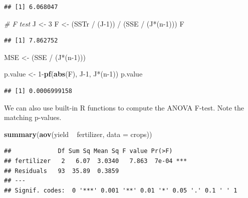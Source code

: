 \documentclass[]{book}
\newenvironment{Shaded}{\begin{snugshade}}{\end{snugshade}}
\newcommand{\KeywordTok}[1]{\textcolor[rgb]{0.13,0.29,0.53}{\textbf{{#1}}}}
\newcommand{\DataTypeTok}[1]{\textcolor[rgb]{0.13,0.29,0.53}{{#1}}}
\newcommand{\DecValTok}[1]{\textcolor[rgb]{0.00,0.00,0.81}{{#1}}}
\newcommand{\StringTok}[1]{\textcolor[rgb]{0.31,0.60,0.02}{{#1}}}
\newcommand{\CommentTok}[1]{\textcolor[rgb]{0.56,0.35,0.01}{\textit{{#1}}}}
\newcommand{\NormalTok}[1]{{#1}}
\begin{document}
\begin{verbatim}
## [1] 6.068047
\end{verbatim}

\begin{Shaded}
\begin{Highlighting}[]
\CommentTok{# F test}
\NormalTok{J <-}\StringTok{ }\DecValTok{3}
\NormalTok{F <-}\StringTok{ }\NormalTok{(SSTr /}\StringTok{ }\NormalTok{(J}\DecValTok{-1}\NormalTok{)) /}\StringTok{ }\NormalTok{(SSE /}\StringTok{ }\NormalTok{(J*(n}\DecValTok{-1}\NormalTok{)))}
\NormalTok{F}
\end{Highlighting}
\end{Shaded}

\begin{verbatim}
## [1] 7.862752
\end{verbatim}

\begin{Shaded}
\begin{Highlighting}[]
\NormalTok{MSE <-}\StringTok{ }\NormalTok{(SSE /}\StringTok{ }\NormalTok{(J*(n}\DecValTok{-1}\NormalTok{)))}

\NormalTok{p.value <-}\StringTok{ }\DecValTok{1}\NormalTok{-}\KeywordTok{pf}\NormalTok{(}\KeywordTok{abs}\NormalTok{(F), J}\DecValTok{-1}\NormalTok{, J*(n}\DecValTok{-1}\NormalTok{))}
\NormalTok{p.value}
\end{Highlighting}
\end{Shaded}

\begin{verbatim}
## [1] 0.0006999158
\end{verbatim}

We can also use built-in R functions to compute the ANOVA F-test. Note
the matching p-values.

\begin{Shaded}
\begin{Highlighting}[]
\KeywordTok{summary}\NormalTok{(}\KeywordTok{aov}\NormalTok{(yield ~}\StringTok{ }\NormalTok{fertilizer, }\DataTypeTok{data =} \NormalTok{crops))}
\end{Highlighting}
\end{Shaded}

\begin{verbatim}
##             Df Sum Sq Mean Sq F value Pr(>F)    
## fertilizer   2   6.07  3.0340   7.863  7e-04 ***
## Residuals   93  35.89  0.3859                   
## ---
## Signif. codes:  0 '***' 0.001 '**' 0.01 '*' 0.05 '.' 0.1 ' ' 1
\end{verbatim}
\end{document}
